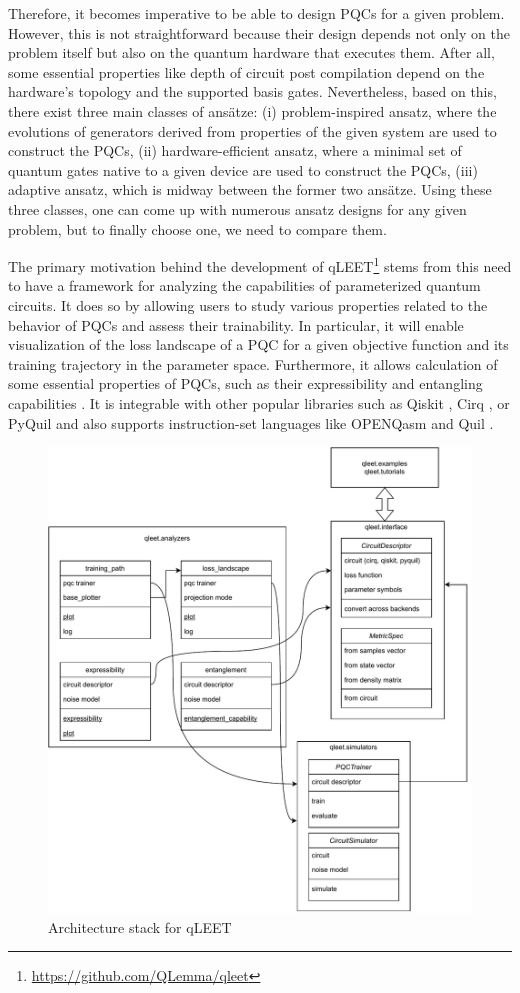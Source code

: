 Therefore, it becomes imperative to be able to design PQCs for a given problem. However, this is not straightforward because their design depends not only on the problem itself but also on the quantum hardware that executes them. After all, some essential properties like depth of circuit post compilation depend on the hardware's topology and the supported basis gates. Nevertheless, based on this, there exist three main classes of ansätze: (i) problem-inspired ansatz, where the evolutions of generators derived from properties of the given system are used to construct the PQCs, (ii) hardware-efficient ansatz, where a minimal set of quantum gates native to a given device are used to construct the PQCs, (iii) adaptive ansatz, which is midway between the former two ansätze. Using these three classes, one can come up with numerous ansatz designs for any given problem, but to finally choose one, we need to compare them.

The primary motivation behind the development of qLEET\footnote{\href{https://github.com/QLemma/qleet}{https://github.com/QLemma/qleet}} \cite{qleet-zenodo} stems from this need to have a framework for analyzing the capabilities of parameterized quantum circuits. It does so by allowing users to study various properties related to the behavior of PQCs and assess their trainability. In particular, it will enable visualization of the loss landscape of a PQC for a given objective function and its training trajectory in the parameter space. Furthermore, it allows calculation of some essential properties of PQCs, such as their expressibility and entangling capabilities \cite{10.1002/qute.201900070}. It is integrable with other popular libraries such as Qiskit \cite{comp_qiskit}, Cirq \cite{comp_cirq}, or PyQuil \cite{ccquad_Pyquil} and also supports instruction-set languages like OPENQasm \cite{2021arXiv210414722C} and Quil \cite{ccquad_Pyquil}.

\begin{figure}[!htp]
    \centering
    \includegraphics[width=0.5\linewidth]{figures/qleet/qleet-architecture.pdf}
    \caption{Architecture stack for qLEET}
    \label{qleet-fig:qleet-architecture}
\end{figure}

